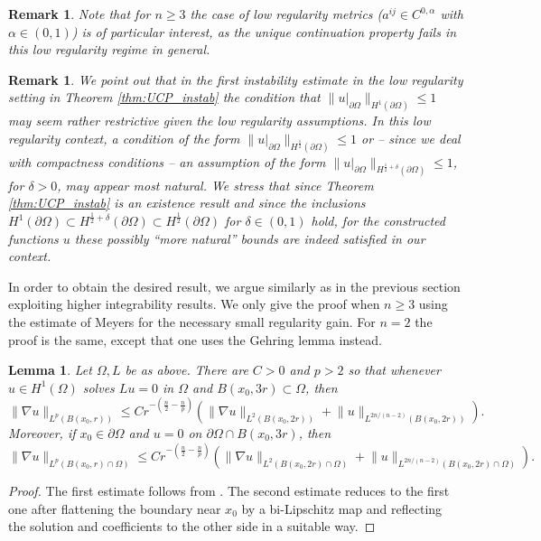 \documentclass[12pt,twoside]{amsart}
\numberwithin{equation}{section}
\renewcommand{\leq}{\leqslant}
\renewcommand{\geq}{\geqslant}
\newtheorem{lemma}[theorem]{Lemma}
\newtheorem{remark}[theorem]{Remark}
\newcommand {\p} {\partial}
\newcommand{\norm}[1]{\lVert #1 \rVert}         %
\begin{document}
\begin{remark}
\label{rmk:instab_low_reg}
Note that for $n\geq 3$ the case of low regularity metrics ($a^{ij}\in C^{0,\alpha}$ with $\alpha \in (0,1)$) is of particular interest, as the unique continuation property fails in this low regularity regime in general. 
\end{remark}

\begin{remark}
\label{rmk:regularity}
We point out that in the first instability estimate in the low regularity setting in Theorem \ref{thm:UCP_instab} the condition that $\|u|_{\partial \Omega}\|_{H^1(\partial \Omega)} \leq 1$ may seem rather restrictive given the low regularity assumptions. In this low regularity context, a condition of the form $\|u|_{\partial \Omega}\|_{H^{\frac{1}{2}}(\partial \Omega)} \leq 1$ or -- since we deal with compactness conditions -- an assumption of the form $\|u|_{\partial \Omega}\|_{H^{\frac{1}{2}+\delta}(\partial \Omega)} \leq 1$, for $\delta>0$, may appear most natural. We stress that since Theorem \ref{thm:UCP_instab} is an \emph{existence result} and since the inclusions $H^1(\partial \Omega) \subset H^{\frac{1}{2}+\delta}(\partial \Omega) \subset H^{\frac{1}{2}}(\partial \Omega)$ for $\delta \in (0,1)$ hold, for the constructed functions $u$ these possibly ``more natural'' bounds are indeed satisfied in our context. 
\end{remark}


In order to obtain the desired result, we argue similarly as in the previous section exploiting higher integrability results. We only give the proof when $n \geq 3$ using the estimate of Meyers \cite{M63} for the necessary small regularity gain. For $n=2$ the proof is the same, except that one uses the Gehring lemma instead.

\begin{lemma} \label{lemma_meyers}
Let $\Omega, L$ be as above. There are $C > 0$ and $p > 2$ so that whenever $u \in H^1(\Omega)$ solves $Lu = 0$ in $\Omega$ and $B(x_0,3r) \subset \Omega$, then 
\[
\norm{\nabla u}_{L^p(B(x_0,r))} \leq C r^{-(\frac{n}{2}-\frac{n}{p})} ( \norm{\nabla u}_{L^2(B(x_0,2r))} + \norm{u}_{L^{2n/(n-2)}(B(x_0,2r))} ).
\]
Moreover, if $x_0 \in \p \Omega$ and $u = 0$ on $\p \Omega \cap B(x_0,3r)$, then 
\[
\norm{\nabla u}_{L^p(B(x_0,r) \cap \Omega)} \leq C r^{-(\frac{n}{2}-\frac{n}{p})} ( \norm{\nabla u}_{L^2(B(x_0,2r) \cap \Omega)} + \norm{u}_{L^{2n/(n-2)}(B(x_0,2r) \cap \Omega)} ).
\]
\end{lemma}
\begin{proof}
The first estimate follows from \cite[Theorem 2]{M63}. The second estimate reduces to the first one after flattening the boundary near $x_0$ by a bi-Lipschitz map and reflecting the solution and coefficients to the other side in a suitable way.
\end{proof}
\end{document}
